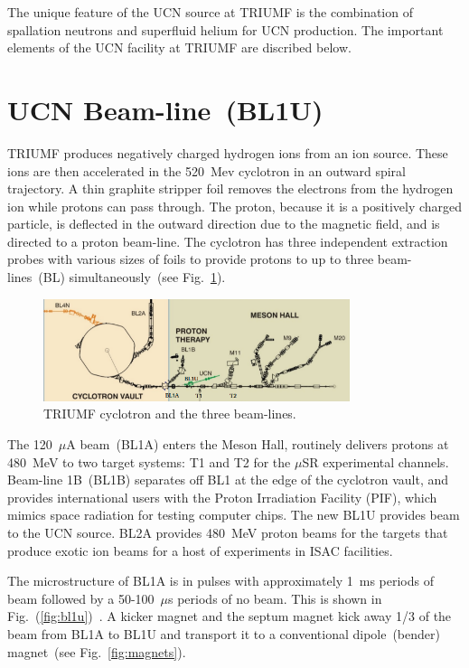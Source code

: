 The unique feature of the UCN source at TRIUMF is the combination of
spallation neutrons and superfluid helium for UCN production. The
important elements of the UCN facility at TRIUMF are discribed below.


\section{UCN Beam-line~(BL1U)}
TRIUMF produces negatively charged hydrogen ions from an ion
source. These ions are then accelerated in the 520~Mev cyclotron in an
outward spiral trajectory. A thin graphite stripper foil removes the
electrons from the hydrogen ion while protons can pass through. The
proton, because it is a positively charged particle, is deflected in
the outward direction due to the magnetic field, and is directed to a
proton beam-line. The cyclotron has three independent extraction
probes with various sizes of foils to provide protons to up to three
beam-lines~(BL) simultaneously~(see Fig.~\ref{fig:cyclotron}).

\begin{figure}[h!]
  \centering
  \includegraphics[width=0.8\textwidth]{cyclotron.png}
  \caption{TRIUMF cyclotron and the three beam-lines.}
  \label{fig:cyclotron}
\end{figure}


The 120~$\mu$A beam~(BL1A) enters the Meson Hall, routinely delivers
protons at 480~MeV to two target systems: T1 and T2 for the $\mu$SR
experimental channels. Beam-line 1B~(BL1B) separates off BL1 at the
edge of the cyclotron vault, and provides international users with the
Proton Irradiation Facility (PIF), which mimics space radiation for
testing computer chips. The new BL1U provides beam to the UCN
source. BL2A provides 480~MeV proton beams for the targets that
produce exotic ion beams for a host of experiments in ISAC facilities.


The microstructure of BL1A is in pulses with approximately 1~ms
periods of beam followed by a 50-100~$\mu$s periods of no beam.  This
is shown in Fig.~(\ref{fig:bl1u})~\cite{Nick_thesis}. A kicker magnet
and the septum magnet kick away 1/3 of the beam from BL1A to BL1U and
transport it to a conventional dipole~(bender) magnet~(see
Fig.~\ref{fig:magnets}).

